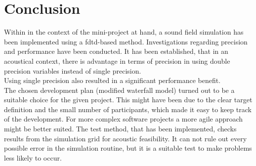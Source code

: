 \chapter{Conclusion}
Within in the context of the mini-project at hand, a sound field simulation has been implemented using a \gls{fdtd}-based method. Investigations regarding precision and performance have been conducted. It has been established, that in an acoustical context, there is advantage in terms of precision in using double precision variables instead of single precision.\\
Using single precision also resulted in a significant performance benefit.\\
The chosen development plan (modified waterfall model) turned out to be a suitable choice for the given project. This might have been due to the clear target definition and the small number of participants, which made it easy to keep track of the development. For more complex software projects a more agile approach might be better suited.
The test method, that has been implemented, checks results from the simulation grid for acoustic feasibility. It can not rule out every possible error in the simulation routine, but it is a suitable test to make problems less likely to occur.